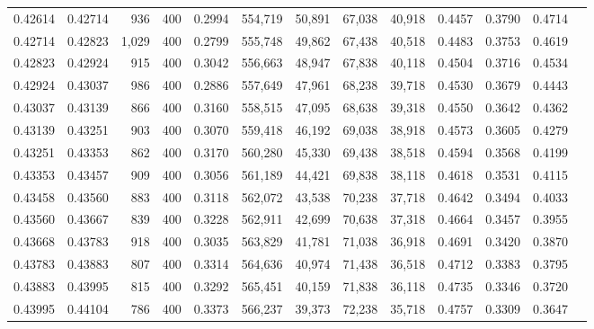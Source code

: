 \begin{tabular}{rrrrrrrrrrrrr}
0.42614 & 0.42714 &    936 &   400 &                                     0.2994 & 554,719 &  50,891 &  67,038 &  40,918 & 0.4457 & 0.3790 & 0.4714 \\
0.42714 & 0.42823 &  1,029 &   400 &                                     0.2799 & 555,748 &  49,862 &  67,438 &  40,518 & 0.4483 & 0.3753 & 0.4619 \\
0.42823 & 0.42924 &    915 &   400 &                                     0.3042 & 556,663 &  48,947 &  67,838 &  40,118 & 0.4504 & 0.3716 & 0.4534 \\
0.42924 & 0.43037 &    986 &   400 &                                     0.2886 & 557,649 &  47,961 &  68,238 &  39,718 & 0.4530 & 0.3679 & 0.4443 \\
0.43037 & 0.43139 &    866 &   400 &                                     0.3160 & 558,515 &  47,095 &  68,638 &  39,318 & 0.4550 & 0.3642 & 0.4362 \\
0.43139 & 0.43251 &    903 &   400 &                                     0.3070 & 559,418 &  46,192 &  69,038 &  38,918 & 0.4573 & 0.3605 & 0.4279 \\
0.43251 & 0.43353 &    862 &   400 &                                     0.3170 & 560,280 &  45,330 &  69,438 &  38,518 & 0.4594 & 0.3568 & 0.4199 \\
0.43353 & 0.43457 &    909 &   400 &                                     0.3056 & 561,189 &  44,421 &  69,838 &  38,118 & 0.4618 & 0.3531 & 0.4115 \\
0.43458 & 0.43560 &    883 &   400 &                                     0.3118 & 562,072 &  43,538 &  70,238 &  37,718 & 0.4642 & 0.3494 & 0.4033 \\
0.43560 & 0.43667 &    839 &   400 &                                     0.3228 & 562,911 &  42,699 &  70,638 &  37,318 & 0.4664 & 0.3457 & 0.3955 \\
0.43668 & 0.43783 &    918 &   400 &                                     0.3035 & 563,829 &  41,781 &  71,038 &  36,918 & 0.4691 & 0.3420 & 0.3870 \\
0.43783 & 0.43883 &    807 &   400 &                                     0.3314 & 564,636 &  40,974 &  71,438 &  36,518 & 0.4712 & 0.3383 & 0.3795 \\
0.43883 & 0.43995 &    815 &   400 &                                     0.3292 & 565,451 &  40,159 &  71,838 &  36,118 & 0.4735 & 0.3346 & 0.3720 \\
0.43995 & 0.44104 &    786 &   400 &                                     0.3373 & 566,237 &  39,373 &  72,238 &  35,718 & 0.4757 & 0.3309 & 0.3647 \\

\end{tabular}
